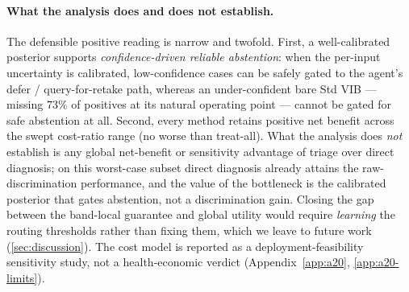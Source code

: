 \paragraph{What the analysis does and does not establish.}
The defensible positive reading is narrow and twofold. First, a well-calibrated
posterior supports \emph{confidence-driven reliable abstention}: when the per-input
uncertainty is calibrated, low-confidence cases can be safely gated to the agent's
defer / query-for-retake path, whereas an under-confident bare Std VIB --- missing
$73\%$ of positives at its natural operating point --- cannot be gated for safe
abstention at all. Second, every method retains positive net benefit across the swept
cost-ratio range (no worse than treat-all). What the analysis does \emph{not}
establish is any global net-benefit or sensitivity advantage of triage over direct
diagnosis; on this worst-case subset direct diagnosis already attains the
raw-discrimination performance, and the value of the bottleneck is the calibrated
posterior that gates abstention, not a discrimination gain. Closing the gap between
the band-local guarantee and global utility would require \emph{learning} the routing
thresholds rather than fixing them, which we leave to future work
(\cref{sec:discussion}). The cost model is reported as a deployment-feasibility
sensitivity study, not a health-economic verdict
(Appendix~\ref{app:a20}, \ref{app:a20-limits}).
